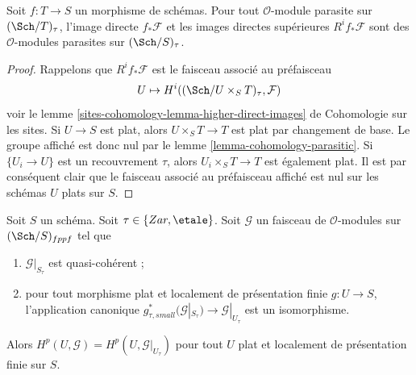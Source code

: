 \begin{lemma}
\label{lemma-direct-image-parasitic}
Soit $f : T \to S$ un morphisme de schémas. Pour tout
$\mathcal{O}$-module parasite sur $(\Sch/T)_\tau$, l'image directe
$f_*\mathcal{F}$ et les images directes supérieures $R^if_*\mathcal{F}$
sont des $\mathcal{O}$-modules parasites sur $(\Sch/S)_\tau$.
\end{lemma}

\begin{proof}
Rappelons que $R^if_*\mathcal{F}$ est le faisceau associé au préfaisceau
$$
U \mapsto H^i((\Sch/U \times_S T)_\tau, \mathcal{F})
$$
voir le lemme \ref{sites-cohomology-lemma-higher-direct-images} de
Cohomologie sur les sites.
Si $U \to S$ est plat, alors $U \times_S T \to T$ est plat par changement de
base. Le groupe affiché est donc nul par le
lemme \ref{lemma-cohomology-parasitic}. Si $\{U_i \to U\}$ est un
recouvrement $\tau$, alors $U_i \times_S T \to T$ est également plat.
Il est par conséquent clair que le faisceau associé au préfaisceau affiché
est nul sur les schémas $U$ plats sur $S$.
\end{proof}

\begin{lemma}
\label{lemma-quasi-coherent-and-flat-base-change}
Soit $S$ un schéma. Soit $\tau \in \{Zar, \etale\}$.
Soit $\mathcal{G}$ un faisceau de $\mathcal{O}$-modules sur
$(\Sch/S)_{fppf}$ tel que
\begin{enumerate}
\item $\mathcal{G}|_{S_\tau}$ est quasi-cohérent ;
\item pour tout morphisme plat et localement de présentation finie
$g : U \to S$, l'application canonique
$g_{\tau, small}^*(\mathcal{G}|_{S_\tau}) \to \mathcal{G}|_{U_\tau}$
est un isomorphisme.
\end{enumerate}
Alors $H^p(U, \mathcal{G}) = H^p(U, \mathcal{G}|_{U_\tau})$ pour tout $U$
plat et localement de présentation finie sur $S$.
\end{lemma}


